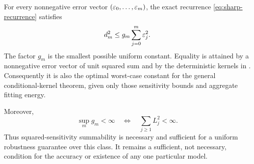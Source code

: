 \begin{theorem}\label{thm:optimal-gain}
For every nonnegative error vector $(\varepsilon_0,\ldots,\varepsilon_m)$, the exact recurrence \eqref{eq:sharp-recurrence} satisfies
\begin{equation}\label{eq:optimal-energy-bound}
 d_m^2\le g_m\sum_{j=0}^m\varepsilon_j^2.
\end{equation}
The factor $g_m$ is the smallest possible uniform constant. Equality is attained by a nonnegative error vector of unit squared sum and by the deterministic kernels in . Consequently it is also the optimal worst-case constant for the general conditional-kernel theorem, given only those sensitivity bounds and aggregate fitting energy.

Moreover,
\begin{equation}\label{eq:gain-threshold}
 \sup_m g_m<\infty
 \quad\Longleftrightarrow\quad
 \sum_{j\ge1}L_j^2<\infty.
\end{equation}
Thus squared-sensitivity summability is necessary and sufficient for a uniform robustness guarantee over this class. It remains a sufficient, not necessary, condition for the accuracy or existence of any one particular model.
\end{theorem}
